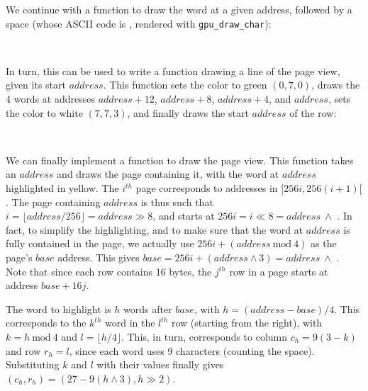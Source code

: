 We continue with a function to draw the word at a given address, followed by a
space (whose ASCII code is , rendered with \verb!gpu_draw_char!):

\begin{TwoColumns}
\\
\end{TwoColumns}

In turn, this can be used to write a function drawing a line of the page view,
given its start $address$. This function sets the color to green $(0,7,0)$,
draws the 4 words at addresses $address+12$, $address+8$, $address+4$, and
$address$, sets the color to white $(7,7,3)$, and finally draws the start
$address$ of the row:

\begin{TwoColumns}
\\
\end{TwoColumns}

We can finally implement a function to draw the page view. This function takes
an $address$ and draws the page containing it, with the word at $address$
highlighted in yellow. The $i^{th}$ page corresponds to addresses in
$[256i,256(i+1)[$. The page containing $address$ is thus such that $i=\lfloor
address/256 \rfloor=address \gg 8$, and starts at $256i=i\ll 8=address\ \wedge$
. In fact, to simplify the highlighting, and to make sure that
the word at $address$ is fully contained in the page, we actually use $256i +
(address\ \mathrm{mod}\ 4)$ as the page's $base$ address. This gives
$base=256i+(address \wedge 3)=address\ \wedge$ . Note that since
each row contains 16 bytes, the $j^{th}$ row in a page starts
at address $base+16j$.

The word to highlight is $h$ words after $base$, with $h=(address-base)/4$.
This corresponds to the $k^{th}$ word in the $l^{th}$ row (starting from the
right), with $k = h\ \mathrm{mod}\ 4$ and $l=\lfloor h/4 \rfloor$. This, in
turn, corresponds to column $c_h=9(3 - k)$ and row $r_h=l$, since each word
uses 9 characters (counting the space). Substituting $k$ and $l$ with their
values finally gives $(c_h,r_h) = (27 - 9(h \wedge 3), h \gg 2)$.

